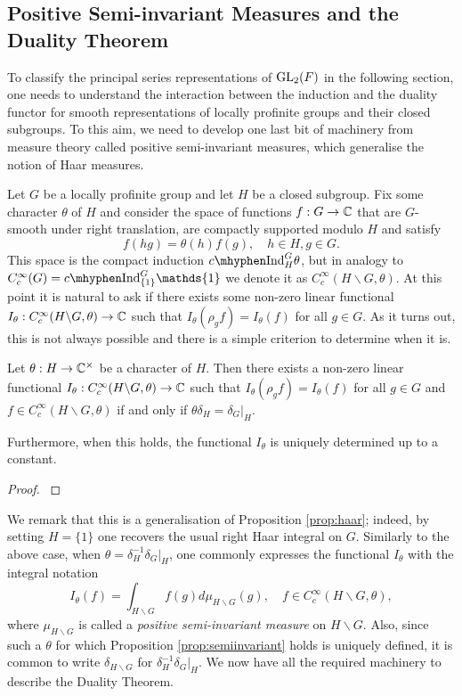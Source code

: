 \subsection{Positive Semi-invariant Measures and the Duality Theorem}

To classify the principal series representations of $\mathrm{GL}_2(F)$ in the following section, one needs to understand the interaction between the induction and the duality functor for smooth representations of locally profinite groups and their closed subgroups. To this aim, we need to develop one last bit of machinery from measure theory called positive semi-invariant measures, which generalise the notion of Haar measures.

Let $G$ be a locally profinite group and let $H$ be a closed subgroup. Fix some character $\theta$ of $H$ and consider the space of functions $f:G\to\mathbb{C}$ that are $G$-smooth under right translation, are compactly supported modulo $H$ and satisfy $$f(hg)=\theta(h)f(g),\quad h\in H,g\in G.$$
This space is the compact induction $\cInd_H^G\theta$, but in analogy to $\CG=\cInd_{\{1\}}^G\mathds{1}$ we denote it as $C_c^{\infty}(H\backslash G,\theta)$. At this point it is natural to ask if there exists some non-zero linear functional $I_{\theta}:C_c^{\infty}(H\backslash G,\theta)\to\mathbb{C}$ such that $I_{\theta}(\rho_g f)=I_{\theta}(f)$ for all $g\in G$. As it turns out, this is not always possible and there is a simple criterion to determine when it is.

\begin{prop}\label{prop:semiinvariant}
    Let $\theta:H\to\mathbb{C}^{\times}$ be a character of $H$. Then there exists a non-zero linear functional $I_{\theta}:C_c^{\infty}(H\backslash G,\theta)\to\mathbb{C}$ such that $I_{\theta}(\rho_g f)=I_{\theta}(f)$ for all $g\in G$ and $f\in C_c^{\infty}(H\backslash G,\theta)$ if and only if $\theta\delta_H=\delta_G|_H$.

    Furthermore, when this holds, the functional $I_\theta$ is uniquely determined up to a constant.
\end{prop}
\begin{proof}
    \cite[Proposition 3.4]{BH1}
\end{proof}

We remark that this is a generalisation of Proposition \ref{prop:haar}; indeed, by setting $H=\{1\}$ one recovers the usual right Haar integral on $G$. Similarly to the above case, when $\theta=\delta_H^{-1}\delta_G|_H$, one commonly expresses the functional $I_\theta$ with the integral notation 
$$I_\theta(f)=\int_{H\backslash G}f(g)d\mu_{H\backslash G}(g),\quad f\in C_c^{\infty}(H\backslash G,\theta),$$
where $\mu_{H\backslash G}$ is called a \textit{positive semi-invariant measure} on $H\backslash G$. Also, since such a $\theta$ for which Proposition \ref{prop:semiinvariant} holds is uniquely defined, it is common to write $\delta_{H\backslash G}$ for $\delta_H^{-1}\delta_G|_H$. We now have all the required machinery to describe the Duality Theorem.

